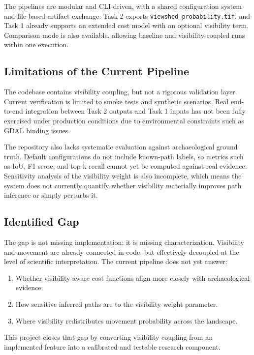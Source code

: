 \documentclass[11pt]{article}
\begin{document}
The pipelines are modular and CLI-driven, with a shared configuration system and file-based artifact exchange. Task 2 exports \texttt{viewshed\_probability.tif}, and Task 1 already supports an extended cost model with an optional visibility term. Comparison mode is also available, allowing baseline and visibility-coupled runs within one execution.

\subsection{Limitations of the Current Pipeline}

The codebase contains visibility coupling, but not a rigorous validation layer. Current verification is limited to smoke tests and synthetic scenarios. Real end-to-end integration between Task 2 outputs and Task 1 inputs has not been fully exercised under production conditions due to environmental constraints such as GDAL binding issues.

The repository also lacks systematic evaluation against archaeological ground truth. Default configurations do not include known-path labels, so metrics such as IoU, F1 score, and top-k recall cannot yet be computed against real evidence. Sensitivity analysis of the visibility weight is also incomplete, which means the system does not currently quantify whether visibility materially improves path inference or simply perturbs it.

\subsection{Identified Gap}

The gap is not missing implementation; it is missing characterization. Visibility and movement are already connected in code, but effectively decoupled at the level of scientific interpretation. The current pipeline does not yet answer:

\begin{enumerate}
  \item Whether visibility-aware cost functions align more closely with archaeological evidence.
  \item How sensitive inferred paths are to the visibility weight parameter.
  \item Where visibility redistributes movement probability across the landscape.
\end{enumerate}

This project closes that gap by converting visibility coupling from an implemented feature into a calibrated and testable research component.
\end{document}
